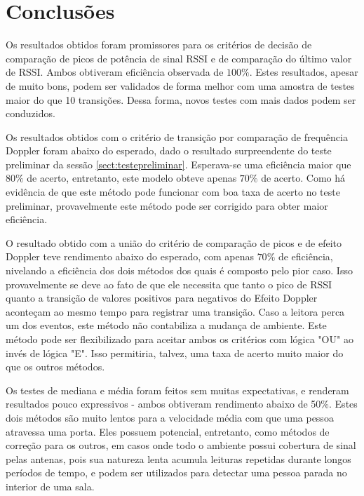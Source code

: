 
\chapter{Conclusões} \label{chap:Conclusao}

\label{CapConclusoes}

Os resultados obtidos foram promissores para os critérios de decisão de comparação de picos de potência de sinal RSSI e de comparação do último valor de RSSI. Ambos obtiveram eficiência observada de $100\%$. Estes resultados, apesar de muito bons, podem ser validados de forma melhor com uma amostra de testes maior do que 10 transições. Dessa forma, novos testes com mais dados podem ser conduzidos.

Os resultados obtidos com o critério de transição por comparação de frequência Doppler foram abaixo do esperado, dado o resultado surpreendente do teste preliminar da sessão \ref{sect:testepreliminar}. Esperava-se uma eficiência maior que $80\%$ de acerto, entretanto, este modelo obteve apenas $70\%$ de acerto. Como há evidência de que este método pode funcionar com boa taxa de acerto no teste preliminar, provavelmente este método pode ser corrigido para obter maior eficiência.

O resultado obtido com a união do critério de comparação de picos e de efeito Doppler teve rendimento abaixo do esperado, com apenas $70\%$ de eficiência, nivelando a eficiência dos dois métodos dos quais é composto pelo pior caso. Isso provavelmente se deve ao fato de que ele necessita que tanto o pico de RSSI quanto a transição de valores positivos para negativos do Efeito Doppler aconteçam ao mesmo tempo para registrar uma transição. Caso a leitora perca um dos eventos, este método não contabiliza a mudança de ambiente. Este método pode ser flexibilizado para aceitar ambos os critérios com lógica "OU" ao invés de lógica "E". Isso permitiria, talvez, uma taxa de acerto muito maior do que os outros métodos.

Os testes de mediana e média foram feitos sem muitas expectativas, e renderam resultados pouco expressivos - ambos obtiveram rendimento abaixo de 50\%. Estes dois métodos são muito lentos para a velocidade média com que uma pessoa atravessa uma porta. Eles possuem potencial, entretanto, como métodos de correção para os outros, em casos onde todo o ambiente possui cobertura de sinal pelas antenas, pois sua natureza lenta acumula leituras repetidas durante longos períodos de tempo, e podem ser utilizados para detectar uma pessoa parada no interior de uma sala.

